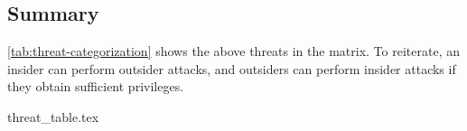 \subsection{Summary}

\cref{tab:threat-categorization} shows the above threats in the matrix.
To reiterate, an insider can perform outsider attacks, and outsiders can perform insider attacks if they obtain sufficient privileges.

{threat_table.tex}
